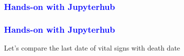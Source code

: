 \documentclass[11pt,pdftex,dvipsnames,usenames]{beamer}
\begin{document}
\begin{frame}[fragile]\frametitle{\bf\textcolor{blue}{Hands-on with Jupyterhub}}

\end{frame}


\begin{frame}[fragile]\frametitle{\bf\textcolor{blue}{Hands-on with Jupyterhub}}
Let's compare the last date of vital signs with death date

\end{frame}
\end{document}
